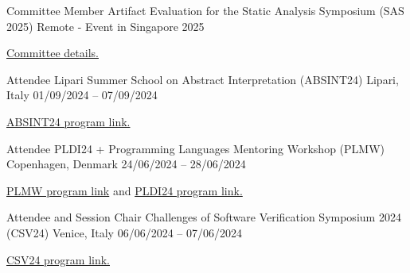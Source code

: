 
\begin{cventries}

    \cventry
        {Committee Member} %
        {Artifact Evaluation for the Static Analysis Symposium (SAS 2025)} %
        {Remote - Event in Singapore} %
        {2025} %
        {
        \begin{cvitems} %
            \item {\href{https://2025.splashcon.org/committee/sas-2025-sas-artifact-sas-artifact-evaluation-committee}{Committee details.}}
        \end{cvitems}
        }

    \cventry
        {Attendee} %
        {Lipari Summer School on Abstract Interpretation (ABSINT24)} %
        {Lipari, Italy} %
        {01/09/2024 – 07/09/2024} %
        {
        \begin{cvitems} %
            \item {\href{https://drive.google.com/file/d/1uhLXjf0C\_OeptfQwxXwk\_3T8aFOkDMYC/view?pli=1}{ABSINT24 program link.}}
        \end{cvitems}
        }

    \cventry
        {Attendee} %
        {PLDI24 + Programming Languages Mentoring Workshop (PLMW)} %
        {Copenhagen, Denmark} %
        {24/06/2024 – 28/06/2024} %
        {
        \begin{cvitems} %
            \item {\href{https://pldi24.sigplan.org/track/PLMW-PLDI-2024\#program}{PLMW program link}
            and \href{https://pldi24.sigplan.org/program/program-pldi-2024/}{PLDI24 program link.}}
        \end{cvitems}
        }

    \vspace{-.7em}  %
    \hspace*{-.4em} %

    \cventry
        {Attendee and Session Chair} %
        {Challenges of Software Verification Symposium 2024 (CSV24)} %
        {Venice, Italy} %
        {06/06/2024 – 07/06/2024} %
        {
        \begin{cvitems} %
            \item {\href{https://unive-ssv.github.io/events/2024/06/06/csv.html}{CSV24 program link.}}
        \end{cvitems}
        }
\end{cventries}
